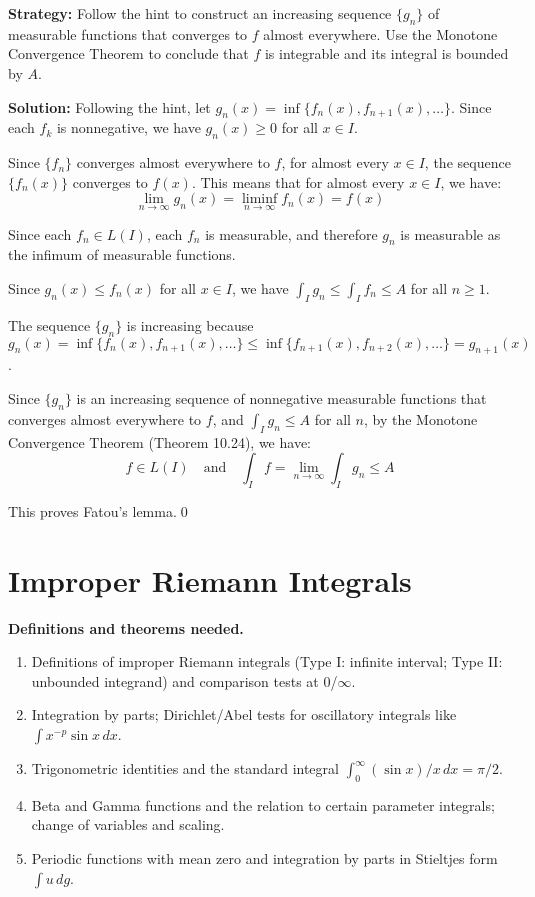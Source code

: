 \noindent\textbf{Strategy:} Follow the hint to construct an increasing sequence $\{g_n\}$ of measurable functions that converges to $f$ almost everywhere. Use the Monotone Convergence Theorem to conclude that $f$ is integrable and its integral is bounded by $A$.

\bigskip\noindent\textbf{Solution:}
Following the hint, let $g_n(x) = \inf \{f_n(x), f_{n+1}(x), \ldots\}$. Since each $f_k$ is nonnegative, we have $g_n(x) \geq 0$ for all $x \in I$.

Since $\{f_n\}$ converges almost everywhere to $f$, for almost every $x \in I$, the sequence $\{f_n(x)\}$ converges to $f(x)$. This means that for almost every $x \in I$, we have:
\[\lim_{n \to \infty} g_n(x) = \liminf_{n \to \infty} f_n(x) = f(x)\]

Since each $f_n \in L(I)$, each $f_n$ is measurable, and therefore $g_n$ is measurable as the infimum of measurable functions.

Since $g_n(x) \leq f_n(x)$ for all $x \in I$, we have $\int_I g_n \leq \int_I f_n \leq A$ for all $n \geq 1$.

The sequence $\{g_n\}$ is increasing because $g_n(x) = \inf \{f_n(x), f_{n+1}(x), \ldots\} \leq \inf \{f_{n+1}(x), f_{n+2}(x), \ldots\} = g_{n+1}(x)$.

Since $\{g_n\}$ is an increasing sequence of nonnegative measurable functions that converges almost everywhere to $f$, and $\int_I g_n \leq A$ for all $n$, by the Monotone Convergence Theorem (Theorem 10.24), we have:
\[f \in L(I) \quad \text{and} \quad \int_I f = \lim_{n \to \infty} \int_I g_n \leq A\]

This proves Fatou's lemma.\qed
\section{Improper Riemann Integrals}

\noindent\textbf{Definitions and theorems needed.}
\begin{enumerate}[label=(\alph*)]
\item Definitions of improper Riemann integrals (Type I: infinite interval; Type II: unbounded integrand) and comparison tests at $0$/$\infty$.
\item Integration by parts; Dirichlet/Abel tests for oscillatory integrals like $\int x^{-p}\sin x\,dx$.
\item Trigonometric identities and the standard integral $\int_0^{\infty} (\sin x)/x\,dx=\pi/2$.
\item Beta and Gamma functions and the relation to certain parameter integrals; change of variables and scaling.
\item Periodic functions with mean zero and integration by parts in Stieltjes form $\int u\,dg$.
\end{enumerate}



